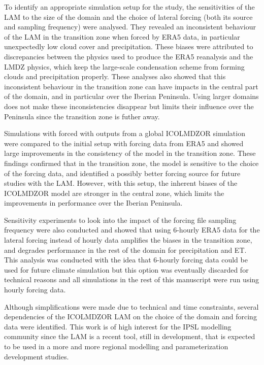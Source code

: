\hfill

To identify an appropriate simulation setup for the study, the sensitivities of the LAM to the size of the domain and the choice of lateral forcing (both its source and sampling frequency) were analysed. They revealed an inconsistent behaviour of the LAM in the transition zone when forced by ERA5 data, in particular unexpectedly low cloud cover and precipitation. These biases were attributed to discrepancies between the physics used to produce the ERA5 reanalysis and the LMDZ physics, which keep the large-scale condensation scheme from forming clouds and precipitation properly.
These analyses also showed that this inconsistent behaviour in the transition zone can have impacts in the central part of the domain, and in particular over the Iberian Peninsula. Using larger domains does not make these inconsistencies disappear but limits their influence over the Peninsula since the transition zone is futher away.

Simulations with forced with outputs from a global ICOLMDZOR simulation were compared to the initial setup with forcing data from ERA5 and showed large improvements in the consistency of the model in the transition zone. These findings confirmed that in the transition zone, the model is sensitive to the choice of the forcing data, and identified a possibly better forcing source for future studies with the LAM. However, with this setup, the inherent biases of the ICOLMDZOR model are stronger  in the central zone, which limits the improvements in performance over the Iberian Peninsula.

Sensitivity experiments to look into the impact of the forcing file sampling frequency were also conducted and showed that using 6-hourly ERA5 data for the lateral forcing instead of hourly data amplifies the biases in the transition zone, and degrades performance in the rest of the domain for precipitation and ET. This analysis was conducted with the idea that 6-hourly forcing data could be used for future climate simulation but this option was eventually discarded for technical reasons and all simulations in the rest of this manuscript were run using hourly forcing data.

Although simplifications were made due to technical and time constraints, several dependencies of the ICOLMDZOR LAM on the choice of the domain and forcing data were identified. This work is of high interest for the IPSL modelling community since the LAM is a recent tool, still in development, that is expected to be used in a more and more regional modelling and parameterization development studies.

